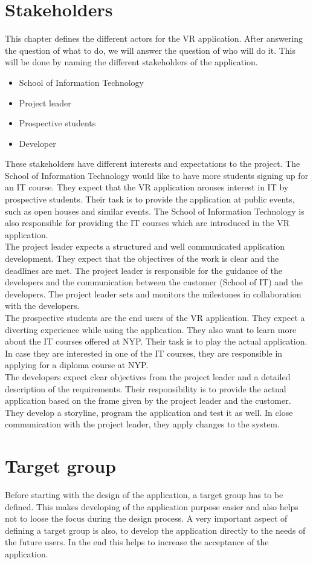 \section{Stakeholders}
This chapter defines the different actors for the VR application. After answering the question of what to do, we will answer the question of who will do it. This will be done by naming the different stakeholders of the application.
\begin{itemize}
\item School of Information Technology
\item Project leader
\item Prospective students
\item Developer
\end{itemize}
These stakeholders have different interests and expectations to the project. The School of Information Technology would like to have more students signing up for an IT course. They expect that the VR application arouses interest in IT by prospective students. Their task is to provide the application at public events, such as open houses and similar events. The School of Information Technology is also responsible for providing the IT courses which are introduced in the VR application. \\
The project leader expects a structured and well communicated application development. They expect that the objectives of the work is clear and the deadlines are met. The project leader is responsible for the guidance of the developers and the communication between the customer (School of IT) and the developers. The project leader sets and monitors the milestones in collaboration with the developers.\\
The prospective students are the end users of the VR application. They expect a diverting experience while using the application. They also want to learn more about the IT courses offered at NYP. Their task is to play the actual application. In case they are interested in one of the IT courses, they are responsible in applying for a diploma course at NYP.\\
The developers expect clear objectives from the project leader and a detailed description of the requirements. Their responsibility is to provide the actual application based on the frame given by the project leader and the customer. They develop a storyline, program the application and test it as well. In close communication with the project leader, they apply changes to the system.
\section{Target group}
Before starting with the design of the application, a target group has to be defined. This makes developing of the application purpose easier and also helps not to loose the focus during the design process. A very important aspect of defining a target group is also, to develop the application directly to the needs of the future users. In the end this helps to increase the acceptance of the application. 

